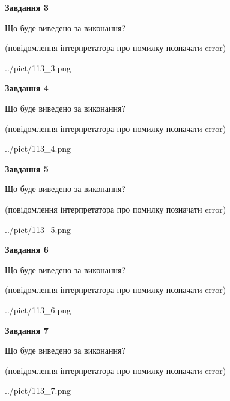 \documentclass[12pt, ukrainian]{article}
\begin{document}
{\begin {large}
{\begin {center}\textbf{Завдання 3}\end {center}}\par
Що буде виведено за виконання?\par
 (повідомлення інтерпретатора про помилку позначати error)\par
\begin{center}
	{../pict/113_3.png}
\end{center}
\newpage

{\begin {center}\textbf{Завдання 4}\end {center}}\par
Що буде виведено за виконання?\par
 (повідомлення інтерпретатора про помилку позначати error)\par
\begin{center}
	{../pict/113_4.png}
\end{center}
\newpage

{\begin {center}\textbf{Завдання 5}\end {center}}\par
Що буде виведено за виконання?\par
 (повідомлення інтерпретатора про помилку позначати error)\par
\begin{center}
	{../pict/113_5.png}
\end{center}
\newpage

{\begin {center}\textbf{Завдання 6}\end {center}}\par
Що буде виведено за виконання?\par
 (повідомлення інтерпретатора про помилку позначати error)\par
\begin{center}
	{../pict/113_6.png}
\end{center}
\newpage

{\begin {center}\textbf{Завдання 7}\end {center}}\par
Що буде виведено за виконання?\par
 (повідомлення інтерпретатора про помилку позначати error)\par
\begin{center}
	{../pict/113_7.png}
\end{center}
\newpage


\end{large}}
\end{document}
